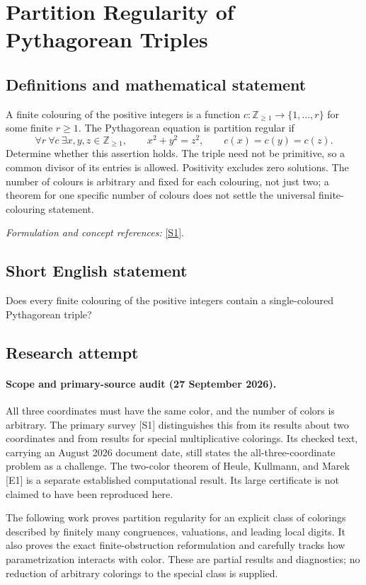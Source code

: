 \documentclass[11pt]{article}
\begin{document}
\section*{\texorpdfstring{Partition Regularity of Pythagorean Triples}{Partition Regularity of Pythagorean Triples}}\label{statement}
\subsection{Definitions and mathematical statement}
A finite colouring of the positive integers is a function $c:{\mathbb{Z}}_{\ge1}\to\{1,\ldots,r\}$ for some finite $r\ge1$. The Pythagorean equation is partition regular if
\[
 \forall r\ \forall c\ \exists x,y,z\in{\mathbb{Z}}_{\ge1},
 \qquad x^2+y^2=z^2,
 \qquad c(x)=c(y)=c(z).
\]
Determine whether this assertion holds. The triple need not be primitive, so a common divisor of its entries is allowed. Positivity excludes zero solutions. The number of colours is arbitrary and fixed for each colouring, not just two; a theorem for one specific number of colours does not settle the universal finite-colouring statement.
\par\smallskip\textit{Formulation and concept references:} \href{https://arxiv.org/abs/2411.17523}{[S1]}.

\subsection{Short English statement}
Does every finite colouring of the positive integers contain a single-coloured Pythagorean triple?
\subsection{Research attempt}
\paragraph{Scope and primary-source audit (27 September 2026).}
All three coordinates must have the same color, and the number of colors is arbitrary. The primary survey [S1] distinguishes this from its results about two coordinates and from results for special multiplicative colorings. Its checked text, carrying an August 2026 document date, still states the all-three-coordinate problem as a challenge. The two-color theorem of Heule, Kullmann, and Marek [E1] is a separate established computational result. Its large certificate is not claimed to have been reproduced here.

The following work proves partition regularity for an explicit class of colorings described by finitely many congruences, valuations, and leading local digits. It also proves the exact finite-obstruction reformulation and carefully tracks how parametrization interacts with color. These are partial results and diagnostics; no reduction of arbitrary colorings to the special class is supplied.
\end{document}
